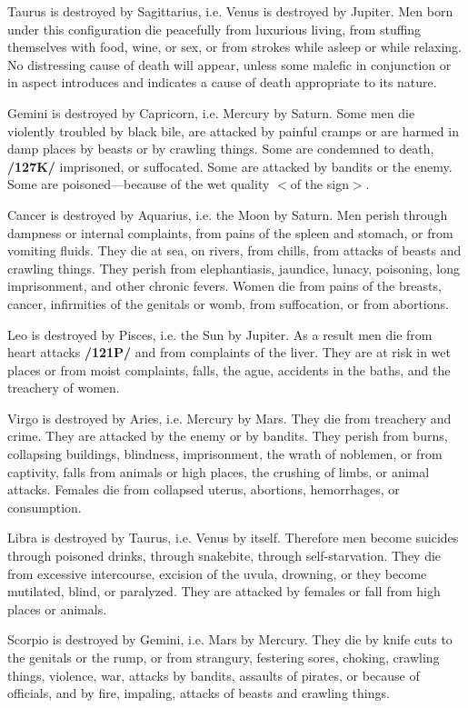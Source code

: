 Taurus \mn{\Taurus} is destroyed by Sagittarius, i.e. Venus is destroyed by Jupiter. Men born under this configuration die peacefully from luxurious living, from stuffing themselves with food, wine, or sex, or from strokes
while asleep or while relaxing. No distressing cause of death will appear, unless some malefic in conjunction or in aspect introduces and indicates a cause of death appropriate to its nature.

Gemini \mn{\Gemini} is destroyed by Capricorn, i.e. Mercury by Saturn. Some men die violently troubled by black bile, are attacked by painful cramps or are harmed in damp places by beasts or by crawling things. Some are condemned to death, \textbf{/127K/} imprisoned, or suffocated. Some are attacked by bandits or the enemy. Some are poisoned—because of the wet quality $<$of the sign$>$.

Cancer \mn{\Cancer} is destroyed by Aquarius, i.e. the Moon by Saturn. Men perish through dampness or internal complaints, from pains of the spleen and stomach, or from vomiting fluids. They die at sea, on rivers, from chills, from attacks of beasts and crawling things. They perish from elephantiasis, jaundice, lunacy, poisoning, long imprisonment, and other chronic fevers. Women die from pains of the breasts, cancer, infirmities of the genitals or womb, from suffocation, or from abortions.

Leo \mn{\Leo} is destroyed by Pisces, i.e. the Sun by Jupiter. As a result men die from heart attacks \textbf{/121P/} and from complaints of the liver. They are at risk in wet places or from moist complaints, falls, the ague, accidents in the baths, and the treachery of women.

Virgo \mn{\Virgo} is destroyed by Aries, i.e. Mercury by Mars. They die from treachery and crime. They are attacked by the enemy or by bandits. They perish from burns, collapsing buildings, blindness, imprisonment, the wrath of noblemen, or from captivity, falls from animals or high places, the crushing of limbs, or animal attacks. Females die from collapsed uterus, abortions, hemorrhages, or consumption.

Libra is destroyed by Taurus, i.e. Venus by itself. Therefore men become suicides through poisoned drinks, through snakebite, through self-starvation. They die from excessive intercourse, excision of the uvula, drowning, or they become mutilated, blind, or paralyzed. They are attacked by females or fall from high places or animals.

Scorpio \mn{\Scorpio} is destroyed by Gemini, i.e. Mars by Mercury. They die by knife cuts to the genitals or the rump, or from strangury, festering sores, choking, crawling things, violence, war, attacks by bandits, assaults of pirates, or because of officials, and by fire, impaling, attacks of beasts and crawling things.

